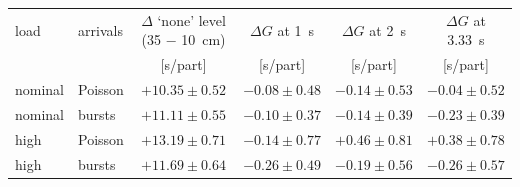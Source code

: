 \begin{tabular}{@{}llcccc@{}}
\toprule
load & arrivals & $\Delta$ `none' level (35 $-$ 10~cm) & $\Delta G$ at 1~s & $\Delta G$ at 2~s & $\Delta G$ at 3.33~s \\
 & & [s/part] & [s/part] & [s/part] & [s/part] \\
\midrule
nominal & Poisson & $+10.35 \pm 0.52$ & $-0.08 \pm 0.48$ & $-0.14 \pm 0.53$ & $-0.04 \pm 0.52$ \\
nominal & bursts & $+11.11 \pm 0.55$ & $-0.10 \pm 0.37$ & $-0.14 \pm 0.39$ & $-0.23 \pm 0.39$ \\
high & Poisson & $+13.19 \pm 0.71$ & $-0.14 \pm 0.77$ & $+0.46 \pm 0.81$ & $+0.38 \pm 0.78$ \\
high & bursts & $+11.69 \pm 0.64$ & $-0.26 \pm 0.49$ & $-0.19 \pm 0.56$ & $-0.26 \pm 0.57$ \\
\bottomrule
\end{tabular}
